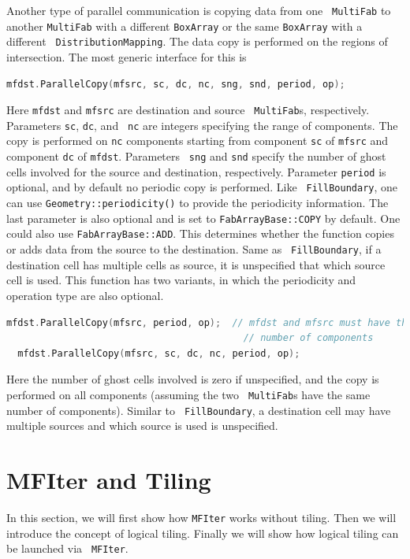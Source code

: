 {{{Another type of parallel communication is copying data from one {\tt
  MultiFab} to another {\tt MultiFab} with a different {\tt BoxArray}
or the same {\tt BoxArray} with a different {\tt
  DistributionMapping}.   The data copy is performed on the regions of
intersection.  The most generic interface for this is
\begin{lstlisting}[language=cpp]
  mfdst.ParallelCopy(mfsrc, sc, dc, nc, sng, snd, period, op);
\end{lstlisting}
Here {\tt mfdst} and {\tt mfsrc} are destination and source {\tt
  MultiFab}s, respectively.  Parameters {\tt sc}, {\tt dc}, and {\tt
  nc} are integers specifying the range of components.  The copy is
performed on {\tt nc} components starting from component {\tt sc} of
{\tt mfsrc} and component {\tt dc} of {\tt mfdst}.  Parameters {\tt
  sng} and {\tt snd} specify the number of ghost cells involved for
the source and destination, respectively.  Parameter {\tt period} is
optional, and by default no periodic copy is performed.  Like {\tt
  FillBoundary}, one can use {\tt Geometry::periodicity()} to provide
the periodicity information.  The last parameter is also optional and
is set to {\tt FabArrayBase::COPY} by default.  One could also use
{\tt FabArrayBase::ADD}.  This determines whether the function copies
or adds data from the source to the destination.  Same as {\tt
  FillBoundary}, if a destination cell has multiple cells as source,
it is unspecified that which source cell is used.  This function has
two variants, in which the periodicity and operation type are also
optional.
\begin{lstlisting}[language=cpp]
  mfdst.ParallelCopy(mfsrc, period, op);  // mfdst and mfsrc must have the same
                                          // number of components
  mfdst.ParallelCopy(mfsrc, sc, dc, nc, period, op);
\end{lstlisting}
Here the number of ghost cells involved is zero if unspecified, and
the copy is performed on all components (assuming the two {\tt
  MultiFab}s have the same number of components).  Similar to {\tt
  FillBoundary}, a destination cell may have multiple sources and
which source is used is unspecified.  

\section{MFIter and Tiling}
\label{sec:basics:mfiter}

In this section, we will first show how {\tt MFIter} works without
tiling.  Then we will introduce the concept of logical tiling.
Finally we will show how logical tiling can be launched via {\tt
  MFIter}. 

}}}
